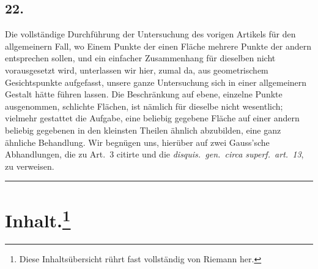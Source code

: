 \documentclass[12pt,a4paper]{article}
\begin{document}
\subsection*{22.}

Die vollständige Durchführung der Untersuchung des vorigen Artikels für den allgemeinern Fall, wo Einem Punkte der einen Fläche mehrere Punkte der andern entsprechen sollen, und ein einfacher Zusammenhang für dieselben nicht vorausgesetzt wird, unterlassen wir hier, zumal da, aus geometrischem Gesichtspunkte aufgefasst, unsere ganze Untersuchung sich in einer allgemeinern Gestalt hätte führen lassen. Die Beschränkung auf ebene, einzelne Punkte ausgenommen, schlichte Flächen, ist nämlich für dieselbe nicht wesentlich; vielmehr gestattet die Aufgabe, eine beliebig gegebene Fläche auf einer andern beliebig gegebenen in den kleinsten Theilen ähnlich abzubilden, eine ganz ähnliche Behandlung. Wir begnügen uns, hierüber auf zwei Gauss'sche Abhandlungen, die zu Art.~3 citirte und die \textit{disquis.\ gen.\ circa superf.\ art.~13}, zu verweisen.

\bigskip
\begin{center}
\rule{0.5\textwidth}{0.4pt}
\end{center}

\vspace{1em}

\section*{Inhalt.\footnote{Diese Inhaltsübersicht rührt fast vollständig von Riemann her.}}
\end{document}
